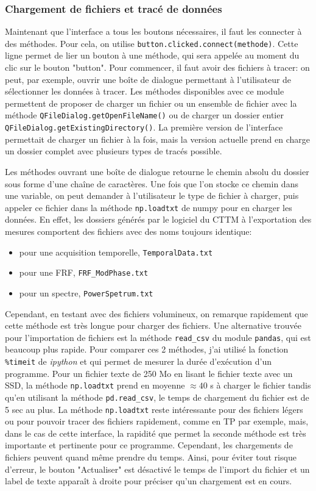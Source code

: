 \documentclass[a4paper, 11pt]{article}
\begin{document}
\subsubsection{Chargement de fichiers et tracé de données}

Maintenant que l'interface a tous les boutons nécessaires, il faut les connecter à des méthodes. Pour cela, on utilise \verb|button.clicked.connect(methode)|. Cette ligne permet de lier un bouton à une méthode, qui sera appelée au moment du clic sur le bouton "button". Pour commencer, il faut avoir des fichiers à tracer: on peut, par exemple, ouvrir une boîte de dialogue permettant à l'utilisateur de sélectionner les données à tracer. Les méthodes disponibles avec ce module permettent de proposer de charger un fichier ou un ensemble de fichier avec la méthode \verb|QFileDialog.getOpenFileName()| ou de charger un dossier entier \verb|QFileDialog.getExistingDirectory()|. La première version de l'interface permettait de charger un fichier à la fois, mais la version actuelle prend en charge un dossier complet avec plusieurs types de tracés possible. 

Les méthodes ouvrant une boîte de dialogue retourne le chemin absolu du dossier sous forme d'une chaîne de caractères. Une fois que l'on stocke ce chemin dans une variable, on peut demander à l'utilisateur le type de fichier à charger, puis appeler ce fichier dans la méthode \verb|np.loadtxt| de numpy pour en charger les données. En effet, les dossiers générés par le logiciel du CTTM à l'exportation des mesures comportent des fichiers avec des noms toujours identique: 
\begin{itemize}
	\item pour une acquisition temporelle, \verb|TemporalData.txt|
	\item pour une FRF, \verb|FRF_ModPhase.txt|
	\item pour un spectre, \verb|PowerSpetrum.txt|
\end{itemize}

Cependant, en testant avec des fichiers volumineux, on remarque rapidement que cette méthode est très longue pour charger des fichiers. Une alternative trouvée pour l'importation de fichiers est la méthode \verb|read_csv| du module \verb|pandas|, qui est beaucoup plus rapide. Pour comparer ces 2 méthodes,  j'ai utilisé la fonction \verb|%timeit| de \textit{ipython} et qui permet de mesurer la durée d'exécution d'un programme. Pour un fichier texte de 250 Mo en lisant le fichier texte avec  un SSD, la méthode \verb|np.loadtxt| prend en moyenne $\approx 40$ s à charger le fichier tandis qu'en utilisant la méthode \verb|pd.read_csv|, le temps de chargement du fichier est de 5 sec au plus. La méthode \verb|np.loadtxt| reste intéressante pour des fichiers légers ou pour pouvoir tracer des fichiers rapidement, comme en TP par exemple, mais, dans le cas de cette interface, la rapidité que permet la seconde méthode est très importante et pertinente pour ce programme. Cependant, les chargements de fichiers peuvent quand même prendre du temps. Ainsi, pour éviter tout risque d'erreur, le bouton "Actualiser" est désactivé le temps de l'import du fichier et un label de texte apparaît à droite pour préciser qu'un chargement est en cours.
\end{document}
